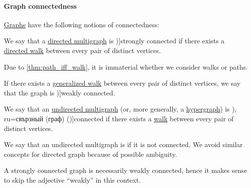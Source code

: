 \paragraph{Graph connectedness}

\begin{definition}\label{def:graph_connectedness}
  \hyperref[rem:arbitrary_kind_graph]{Graphs} have the following notions of connectedness:
  \begin{thmenum}
     We say that a \hyperref[def:directed_multigraph]{directed multigraph} is \term[ru=сильно связаный (граф) (\cite[def. 5.2]{БелоусовТкачёв2004ДискретнаяМатематика})]{strongly connected} if there exists a \hyperref[def:graph_walk/directed]{directed walk} between every pair of distinct vertices.

    Due to \cref{thm:path_iff_walk}, it is immaterial whether we consider walks or paths.

     If there exists a \hyperref[def:graph_walk/generalized]{generalized walk} between every pair of distinct vertices, we say that the graph is \term[ru=слабо связный (граф) (\cite[def. 5.4]{БелоусовТкачёв2004ДискретнаяМатематика})]{weakly connected}.

     We say that an \hyperref[def:hypergraph/multigraph]{undirected multigraph} (or, more generally, a \hyperref[def:hypergraph]{hypergraph}) is \term[bg=свързан (граф) (\cite[13]{Мирчев2001Графи}), ru=свързный (граф) (\cite[285]{БелоусовТкачёв2004ДискретнаяМатематика})]{connected} if there exists a \hyperref[def:graph_walk/undirected]{walk} between every pair of distinct vertices.

    We say that an undirected multigraph is  if it is not connected. We avoid similar concepts for directed graph because of possible ambiguity.
  \end{thmenum}
\end{definition}
\begin{comments}
  \item A strongly connected graph is necessarily weakly connected, hence it makes sense to skip the adjective \enquote{weakly} in this context.
\end{comments}

